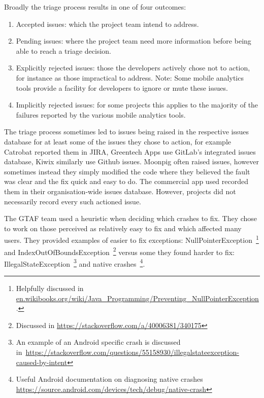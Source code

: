 Broadly the triage process results in one of four outcomes:
\begin{enumerate}
    \item Accepted issues: which the project team intend to address.
    \item Pending issues: where the project team need more information before being able to reach a triage decision.
    \item Explicitly rejected issues: those the developers actively chose not to action, for instance as those impractical to address. Note: Some mobile analytics tools provide a facility for developers to ignore or mute these issues.
    \item Implicitly rejected issues: for some projects this applies to the majority of the failures reported by the various mobile analytics tools.
\end{enumerate}

The triage process sometimes led to issues being raised in the respective issues database for at least some of the issues they chose to action, for example Catrobat reported them in JIRA, Greentech Apps use GitLab's integrated issues database, Kiwix similarly use Github issues. Moonpig often raised issues, however sometimes instead they simply modified the code where they believed the fault was clear and the fix quick and easy to do. The commercial app used recorded them in their organisation-wide issues database. However, projects did not necessarily record every such actioned issue. 


The GTAF team used a heuristic when deciding which crashes to fix. They chose to work on those perceived as relatively easy to fix and which affected many users. They provided examples of easier to fix exceptions: NullPointerException~\footnote{Helpfully discussed in \href{https://en.wikibooks.org/wiki/Java\_Programming/Preventing\_NullPointerException}{en.wikibooks.org/wiki/Java\_Programming/Preventing\_NullPointerException}.} and IndexOutOfBoundsException~\footnote{Discussed in \url{https://stackoverflow.com/a/40006381/340175}} versus some they found harder to fix: IllegalStateException~\footnote{An example of an Android specific crash is discussed in~\url{https://stackoverflow.com/questions/55158930/illegalstateexception-caused-by-intent}} and native crashes~\footnote{Useful Android documentation on diagnosing native crashes \url{https://source.android.com/devices/tech/debug/native-crash}}.


